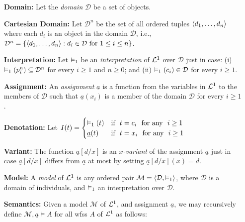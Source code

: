 \documentclass[a4paper, 11pt]{article} %
\begin{document}
\begin{enumerate}[leftmargin=1.2in,labelsep=.15in] %
\item[\bf Domain:] Let the \textit{domain} $\mathcal{D}$ be a set of objects.%
\item[\bf Cartesian Domain:] Let $\mathcal{D}^n$ be the set of all ordered tuples $\langle d_1,\dots,d_n\rangle$ where each $d_i$ is an object in the domain $\mathcal{D}$, i.e., $\mathcal{D}^n=\lbrace\langle d_1,\dots,d_n\rangle:d_i\in\mathcal{D}~\text{for}~1\leq i\leq n\rbrace$.
\item[\bf Interpretation:] Let $\vDash_1$ be an \textit{interpretation} of $\mathcal{L}^1$ over $\mathcal{D}$ just in case: (i) $\vDash_1(p_i^n)\subseteq\mathcal{D}^n$ for every $i\geq1$ and $n\geq0$; and (ii) $\vDash_1(c_i)\in\mathcal{D}$ for every $i\geq1$.
\item[\bf Assignment:] An \textit{assignment} $\underline{a}$ is a function from the variables in $\mathcal{L}^1$ to the members of $\mathcal{D}$ such that $\underline{a}(x_i)$ is a member of the domain $\mathcal{D}$ for every $i\geq1$.
\item[\bf Denotation:] Let $I(t)=
	\begin{cases} 
		\vDash_1(t) & \text{if}~~ t=c_i ~~\text{for any}~~ i\geq1\\
		\underline{a}(t) & \text{if}~~ t=x_i ~~\text{for any}~~ i\geq1
	\end{cases}$
\item[\bf Variant:] The function $\underline{a}[d/x]$ is an \textit{$x$-variant} of the assignment $\underline{a}$ just in case $\underline{a}[d/x]$ differs from $\underline{a}$ at most by setting $\underline{a}[d/x](x)=d$.
\item[\bf Model:] A \textit{model} of $\mathcal{L}^1$ is any ordered pair $\mathcal{M}=\langle\mathcal{D},\vDash_1\rangle$, where $\mathcal{D}$ is a domain of individuals, and $\vDash_1$ an interpretation over $\mathcal{D}$.
\item[\bf Semantics:] Given a model $\mathcal{M}$ of $\mathcal{L}^1$, and assignment $\underline{a}$, we may recursively define $\mathcal{M},\underline{a}\vDash A$ for all wfss $A$ of $\mathcal{L}^1$ as follows:
\begin{small}
\begin{itemize}[leftmargin=.36in]

\end{itemize}
\end{small}
\end{enumerate}
\end{document}
